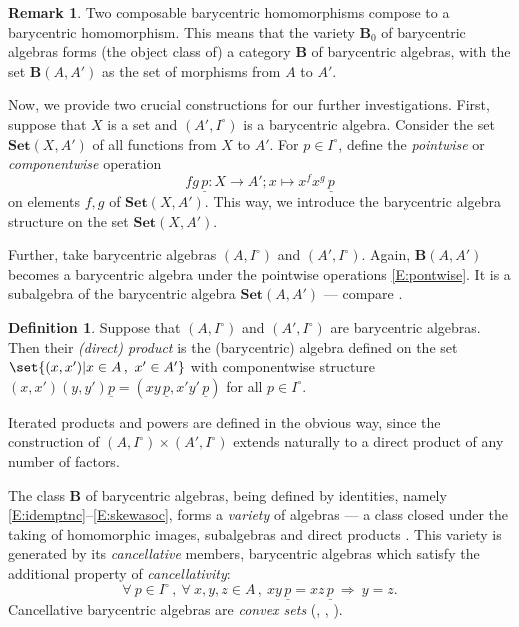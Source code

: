 \documentclass[12pt]{amsart}
\theoremstyle{plain}
\theoremstyle{definition}
\newtheorem{definition}[theorem]{Definition}
\newtheorem{remark}[theorem]{Remark}
\numberwithin{equation}{section}
\begin{document}
\begin{remark}
Two composable barycentric homomorphisms compose to a barycentric homomorphism. This means that the variety $\mathbf B_0$ of barycentric algebras forms (the object class of) a category $\mathbf B$ of barycentric algebras, with the set $\mathbf B(A,A')$ as the set of morphisms from $A$ to $A'$.
\end{remark}

Now, we provide two crucial constructions for our further investigations. First, suppose that $X$ is a set and $(A',I^\circ)$ is a barycentric algebra. Consider the set $\mathbf{Set}(X,A')$ of all functions from $X$ to $A'$. For $p\in I^\circ$, define the \emph{pointwise} or \emph{componentwise} operation
\begin{equation}\label{E:pontwise}
fg\,\underline p\colon X\to A';x\mapsto x^fx^g\,\underline p
\end{equation}
on elements $f,g$ of $\mathbf{Set}(X,A')$. This way, we introduce the barycentric algebra structure on the set $\mathbf{Set}(X,A')$.

Further, take barycentric algebras $(A,I^\circ)$ and $(A',I^\circ)$. Again, $\mathbf B(A,A')$ becomes a barycentric algebra under the pointwise operations \eqref{E:pontwise}. It is a subalgebra of the barycentric algebra $\mathbf{Set}(A,A')$ \cite[\S 2.4.2]{RJSAZD} --- compare \cite[Prop.~5.1]{Modes}.

\begin{definition}
Suppose that $(A,I^\circ)$ and $(A',I^\circ)$ are barycentric algebras. Then their \emph{(direct) product} is the (barycentric) algebra defined on the set  $\set{(x,x')|x\in A\,,\ x'\in A'}$ with componentwise structure
$
(x,x')(y,y')\underline p=\left(xy\,\underline p,x'y'\,\underline p\right)
$
for all $p\in I^\circ$.
\end{definition}

Iterated products and powers are defined in the obvious way, since the construction of $(A,I^\circ)\times (A',I^\circ)$ extends naturally to a direct product of any number of factors.


The class $\mathbf{B}$ of barycentric algebras, being defined by identities, namely  \eqref{E:idemptnc}--\eqref{E:skewasoc}, forms a \emph{variety} of algebras --- a class closed under the taking of homomorphic images, subalgebras and direct products \cite[Th.~IV.2.3.3]{PMA}. This variety is generated by its \emph{cancellative} members, barycentric algebras which satisfy the additional property of \emph{cancellativity}:
$$
\forall\ p\in I^\circ\,,\
\forall\ x,y,z\in A\,,\
xy\,\underline p=xz\,\underline p
\
\Rightarrow
\
y=z.
$$
Cancellative barycentric algebras are \emph{convex sets} (\cite{N70}, \cite[Th.~269]{RS85}, \cite[Th.~5.8.6]{Modes}).
\end{document}
